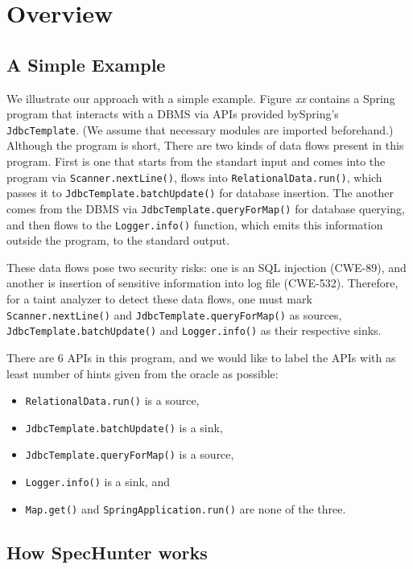 \section{Overview}


\subsection{A Simple Example}



We illustrate our approach with a simple example. Figure \emph{xx} contains a
Spring program that interacts with a DBMS via APIs provided bySpring's
\texttt{JdbcTemplate}. (We assume that necessary modules are imported
beforehand.) Although the program is short, There are two kinds of
data flows present in this program. First is one that starts from
the standart input and comes into the program via \texttt{Scanner.nextLine()},
flows into \texttt{RelationalData.run()}, which passes it to
\texttt{JdbcTemplate.batchUpdate()} for database insertion. The another comes from
the DBMS via \texttt{JdbcTemplate.queryForMap()} for database querying, and then
flows to the \texttt{Logger.info()} function, which emits this information
outside the program, to the standard output.

These data flows pose two security risks: one is an SQL injection (CWE-89),
and another is insertion of sensitive information into log file (CWE-532).
Therefore, for a taint analyzer to detect these data flows, one must mark
\texttt{Scanner.nextLine()} and \texttt{JdbcTemplate.queryForMap()} as sources,
\texttt{JdbcTemplate.batchUpdate()} and \texttt{Logger.info()} as their respective
sinks.

There are 6 APIs in this program, and we would like to label the APIs with 
as least number of hints given from the oracle as possible:

\begin{itemize}
\item \texttt{RelationalData.run()} is a source,
\item \texttt{JdbcTemplate.batchUpdate()} is a sink,
\item \texttt{JdbcTemplate.queryForMap()} is a source,
\item \texttt{Logger.info()} is a sink, and
\item \texttt{Map.get()} and \texttt{SpringApplication.run()} are none of the three.
\end{itemize}

\subsection{How SpecHunter works}

